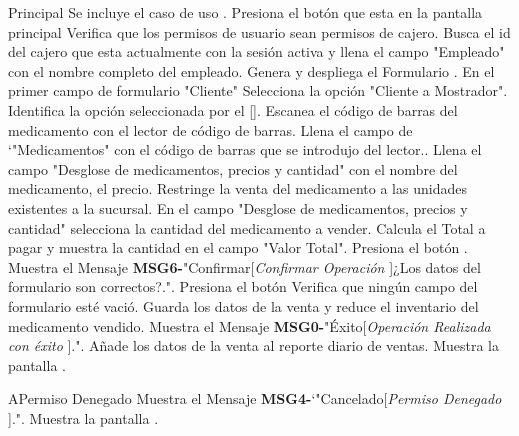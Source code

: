 	\begin{UCtrayectoria}{Principal}
		\UCpaso Se incluye el caso de uso .
		\UCpaso [\UCactor] Presiona el botón  que esta en la pantalla principal 
		\UCpaso Verifica que los permisos de usuario sean permisos de cajero. 		
		\UCpaso Busca el id del cajero que esta actualmente con la sesión activa y llena el campo "Empleado" con el nombre completo del empleado.
		\UCpaso Genera y despliega el Formulario .
		\UCpaso [\UCactor] En el primer campo de formulario "Cliente" Selecciona la opción "Cliente a Mostrador".
		\UCpaso Identifica la opción seleccionada por el [\UCactor].
		\UCpaso [\UCactor] Escanea el código de barras del medicamento con el lector de código de barras.
		\UCpaso Llena el campo de `"Medicamentos" con el código de barras que se introdujo del lector..
		\UCpaso Llena el campo "Desglose de medicamentos, precios y cantidad" con el nombre del medicamento, el precio.
		\UCpaso Restringe la venta del medicamento a las unidades existentes a la sucursal.
		\UCpaso [\UCactor] En el campo "Desglose de medicamentos, precios y cantidad" selecciona la cantidad del medicamento a vender.
		\UCpaso Calcula el Total a pagar y muestra la cantidad en el campo "Valor Total".
		\UCpaso [\UCactor] Presiona el botón .
		\UCpaso Muestra el Mensaje {\bf MSG6-}"Confirmar[{\em Confirmar Operación }]¿Los datos del formulario son correctos?.".
		\UCpaso [\UCactor] Presiona el botón 
		\UCpaso Verifica que ningún campo del formulario esté vació. 
		\UCpaso Guarda los datos de la venta y reduce el inventario del medicamento vendido.
		\UCpaso Muestra el Mensaje {\bf MSG0-}"Éxito[{\em Operación Realizada con éxito }].".
		\UCpaso Añade los datos de la venta al reporte diario de ventas.
		\UCpaso Muestra la pantalla .
	\end{UCtrayectoria}

	\begin{UCtrayectoriaA}{A}{Permiso Denegado}
			\UCpaso Muestra el Mensaje {\bf MSG4-}`"Cancelado[{\em Permiso Denegado }].".
			\UCpaso Muestra la pantalla .
		\end{UCtrayectoriaA}


